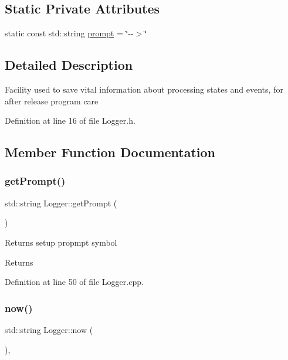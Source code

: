 \subsection*{Static Private Attributes}
\begin{DoxyCompactItemize}
\item 
static const std\+::string \hyperlink{classLogger_a80c00c4446e4310cfbf9ed048edbe979}{prompt} = \char`\"{}-\/-\/$>$\char`\"{}
\end{DoxyCompactItemize}


\subsection{Detailed Description}
Facility used to save vital information about processing states and events, for after release program care 

Definition at line 16 of file Logger.\+h.



\subsection{Member Function Documentation}
\mbox{\label{classLogger_a4004f551a3c44ceb479c7c36e4e1dee8}} 
\subsubsection{\texorpdfstring{get\+Prompt()}{getPrompt()}}
{\footnotesize\ttfamily std\+::string Logger\+::get\+Prompt (\begin{DoxyParamCaption}{ }\end{DoxyParamCaption})\hspace{0.3cm}{\ttfamily [static]}}

Returns setup propmpt symbol \begin{DoxyReturn}{Returns}

\end{DoxyReturn}


Definition at line 50 of file Logger.\+cpp.

\mbox{\label{classLogger_a756a608050fea9f497dd2736f9321f3b}} 
\subsubsection{\texorpdfstring{now()}{now()}}
{\footnotesize\ttfamily std\+::string Logger\+::now (\begin{DoxyParamCaption}{ }\end{DoxyParamCaption})\hspace{0.3cm}{\ttfamily [static]}, {\ttfamily [private]}}


